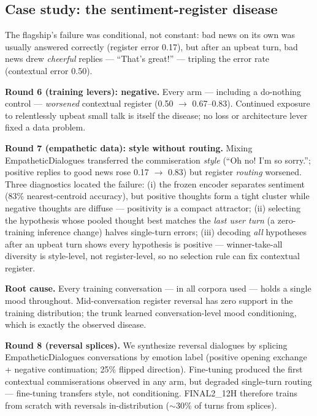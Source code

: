 \documentclass[11pt]{article}
\begin{document}
\subsection{Case study: the sentiment-register disease}
\label{sec:register}

The flagship's failure was conditional, not constant: bad news on its own
was usually answered correctly (register error 0.17), but after an upbeat
turn, bad news drew \emph{cheerful} replies --- ``That's great!'' ---
tripling the error rate (contextual error 0.50).

\textbf{Round 6 (training levers): negative.} Every arm --- including a
do-nothing control --- \emph{worsened} contextual register (0.50 $\to$
0.67--0.83). Continued exposure to relentlessly upbeat small talk is itself
the disease; no loss or architecture lever fixed a data problem.

\textbf{Round 7 (empathetic data): style without routing.} Mixing
EmpatheticDialogues transferred the commiseration \emph{style} (``Oh no! I'm
so sorry.''; positive replies to good news rose 0.17 $\to$ 0.83) but register
\emph{routing} worsened. Three diagnostics located the failure: (i) the
frozen encoder separates sentiment (83\% nearest-centroid accuracy), but
positive thoughts form a tight cluster while negative thoughts are diffuse
--- positivity is a compact attractor; (ii) selecting the hypothesis whose
pooled thought best matches the \emph{last user turn} (a zero-training
inference change) halves single-turn errors; (iii) decoding \emph{all}
hypotheses after an upbeat turn shows every hypothesis is positive ---
winner-take-all diversity is style-level, not register-level, so no
selection rule can fix contextual register.

\textbf{Root cause.} Every training conversation --- in all corpora used ---
holds a single mood throughout. Mid-conversation register reversal has zero
support in the training distribution; the trunk learned conversation-level
mood conditioning, which is exactly the observed disease.

\textbf{Round 8 (reversal splices).} We synthesize reversal dialogues by
splicing EmpatheticDialogues conversations by emotion label (positive opening
exchange + negative continuation; 25\% flipped direction). Fine-tuning
produced the first contextual commiserations observed in any arm, but
degraded single-turn routing --- fine-tuning transfers style, not
conditioning. FINAL2\_12H therefore trains from scratch with reversals
in-distribution ($\sim$30\% of turns from splices).
\end{document}
